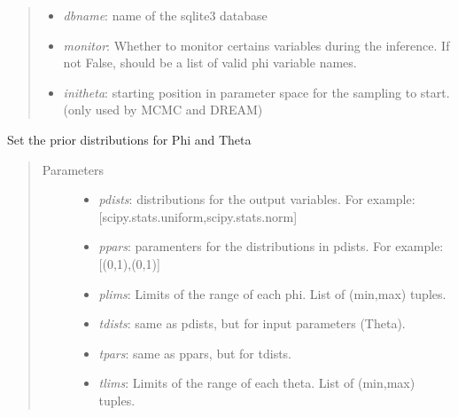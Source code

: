 \documentclass[a4paper,10pt,english]{sphinxmanual}
\begin{document}
\begin{fulllineitems}
\begin{fulllineitems}
\begin{quote}
\begin{description}
\begin{itemize}
\item {} 
\emph{dbname}: name of the sqlite3 database

\item {} 
\emph{monitor}: Whether to monitor certains variables during the inference. If not False, should be a list of valid phi variable names.

\item {} 
\emph{initheta}: starting position in parameter space for the sampling to start. (only used by MCMC and DREAM)

\end{itemize}

\end{description}\end{quote}

\end{fulllineitems}


\begin{fulllineitems}
\label{BIP.Bayes:BIP.Bayes.Melding.FitModel.set_priors}
Set the prior distributions for Phi and Theta
\begin{quote}\begin{description}
\item[{Parameters}] \leavevmode\begin{itemize}
\item {} 
\emph{pdists}: distributions for the output variables. For example: {[}scipy.stats.uniform,scipy.stats.norm{]}

\item {} 
\emph{ppars}: paramenters for the distributions in pdists. For example: {[}(0,1),(0,1){]}

\item {} 
\emph{plims}: Limits of the range of each phi. List of (min,max) tuples.

\item {} 
\emph{tdists}: same as pdists, but for input parameters (Theta).

\item {} 
\emph{tpars}: same as ppars, but for tdists.

\item {} 
\emph{tlims}: Limits of the range of each theta. List of (min,max) tuples.

\end{itemize}

\end{description}\end{quote}

\end{fulllineitems}


\end{fulllineitems}
\end{document}
